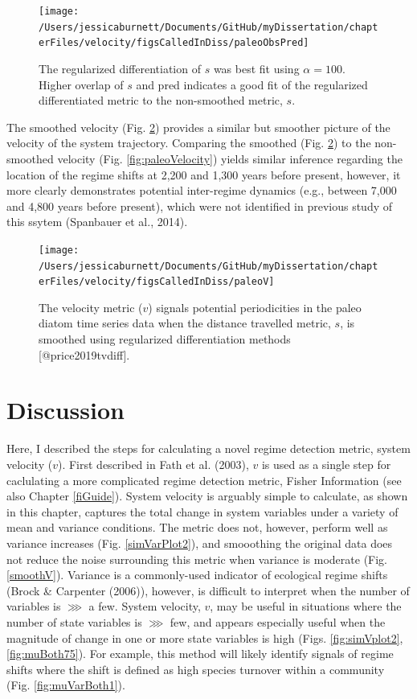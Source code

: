 \documentclass[12pt,twoside,openany]{reedthesis}
\begin{document}
\begin{figure}
\texttt{[image: /Users/jessicaburnett/Documents/GitHub/myDissertation/chapterFiles/velocity/figsCalledInDiss/paleoObsPred]} \caption{The regularized differentiation of $s$ was best fit using $\alpha = 100$. Higher overlap of $s$ and pred indicates a good fit of the regularized differentiated metric to the non-smoothed metric, $s$.}\label{fig:paleoObsPred}
\end{figure}
The smoothed velocity (Fig. \ref{fig:paleoV}) provides a similar but smoother picture of the velocity of the system trajectory. Comparing the smoothed (Fig. \ref{fig:paleoV}) to the non-smoothed velocity (Fig. \ref{fig:paleoVelocity}) yields similar inference regarding the location of the regime shifts at 2,200 and 1,300 years before present, however, it more clearly demonstrates potential inter-regime dynamics (e.g., between 7,000 and 4,800 years before present), which were not identified in previous study of this ssytem (Spanbauer et al., 2014).
\begin{figure}
\texttt{[image: /Users/jessicaburnett/Documents/GitHub/myDissertation/chapterFiles/velocity/figsCalledInDiss/paleoV]} \caption{The velocity metric  ($v$) signals potential periodicities in the paleo diatom time series data when the distance travelled metric, $s$, is smoothed using regularized differentiation methods [@price2019tvdiff].}\label{fig:paleoV}
\end{figure}
\hypertarget{discussion-3}{%
\section{Discussion}\label{discussion-3}}

Here, I described the steps for calculating a novel regime detection metric, system velocity (\(v\)). First described in Fath et al. (2003), \(v\) is used as a single step for caclulating a more complicated regime detection metric, Fisher Information (see also Chapter \ref{fiGuide}). System velocity is arguably simple to calculate, as shown in this chapter, captures the total change in system variables under a variety of mean and variance conditions. The metric does not, however, perform well as variance increases (Fig. \ref{simVarPlot2}), and smooothing the original data does not reduce the noise surrounding this metric when variance is moderate (Fig. \ref{smoothV}). Variance is a commonly-used indicator of ecological regime shifts (Brock \& Carpenter (2006)), however, is difficult to interpret when the number of variables is \(\ggg\) a few. System velocity, \(v\), may be useful in situations where the number of state variables is \(\ggg\) few, and appears especially useful when the magnitude of change in one or more state variables is high (Figs. \ref{fig:simVplot2},\ref{fig:muBoth75}). For example, this method will likely identify signals of regime shifts where the shift is defined as high species turnover within a community (Fig. \ref{fig:muVarBoth1}).
\end{document}
